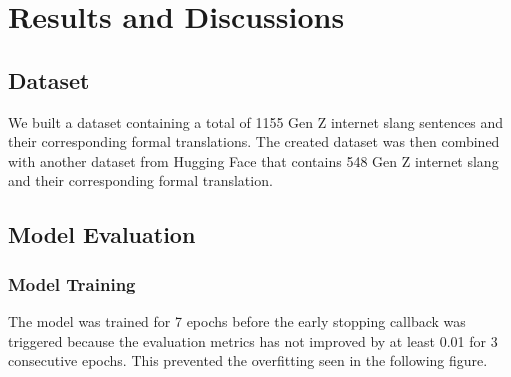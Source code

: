 \chapter{Results and Discussions}
\section{Dataset}
We built a dataset containing a total of 1155 Gen Z internet slang sentences and their corresponding formal translations. The created dataset was then combined with another dataset from Hugging Face that contains 548 Gen Z internet slang and their corresponding formal translation.

\section{Model Evaluation}
\subsection{Model Training}
The model was trained for 7 epochs before the early stopping callback was triggered because the evaluation metrics has not improved by at least 0.01 for 3 consecutive epochs. This prevented the overfitting seen in the following figure. 

